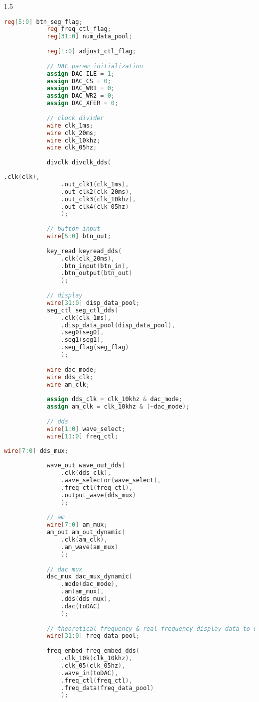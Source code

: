 {\begin{spacing}{1.5}
\begin{lstlisting}[language=Verilog]
			reg[5:0] btn_seg_flag;
			reg freq_ctl_flag;
			reg[31:0] num_data_pool;
		
			reg[1:0] adjust_ctl_flag;
		
			// DAC param initialization
			assign DAC_ILE = 1;
			assign DAC_CS = 0;
			assign DAC_WR1 = 0;
			assign DAC_WR2 = 0;
			assign DAC_XFER = 0;
		
			// clock divider
			wire clk_1ms;
			wire clk_20ms;
			wire clk_10khz;
			wire clk_05hz;
		
			divclk divclk_dds(
			\end{lstlisting}
			\begin{lstlisting}[language=Verilog]
				.clk(clk),
				.out_clk1(clk_1ms),
				.out_clk2(clk_20ms),
				.out_clk3(clk_10khz),
				.out_clk4(clk_05hz)
				);
			
			// button input
			wire[5:0] btn_out;
		
			key_read keyread_dds(
				.clk(clk_20ms),
				.btn_input(btn_in),
				.btn_output(btn_out)
				);
		
			// display
			wire[31:0] disp_data_pool;
			seg_ctl seg_ctl_dds(
				.clk(clk_1ms),
				.disp_data_pool(disp_data_pool),
				.seg0(seg0),
				.seg1(seg1),
				.seg_flag(seg_flag)
				);
		
			wire dac_mode;
			wire dds_clk;
			wire am_clk;
		
			assign dds_clk = clk_10khz & dac_mode;
			assign am_clk = clk_10khz & (~dac_mode);
		
			// dds
			wire[1:0] wave_select;
			wire[11:0] freq_ctl;
		\end{lstlisting}
		\begin{lstlisting}[language=Verilog]
			wire[7:0] dds_mux;
		
			wave_out wave_out_dds(
				.clk(dds_clk),
				.wave_selector(wave_select),
				.freq_ctl(freq_ctl),
				.output_wave(dds_mux)
				);
		
			// am
			wire[7:0] am_mux;
			am_out am_out_dynamic(
				.clk(am_clk),
				.am_wave(am_mux)
				);
		
			// dac mux
			dac_mux dac_mux_dynamic(
				.mode(dac_mode),
				.am(am_mux),
				.dds(dds_mux),
				.dac(toDAC)
				);
		
			// theoretical frequency & real frequency display data to display
			wire[31:0] freq_data_pool;
		
			freq_embed freq_embed_dds(
				.clk_10k(clk_10khz),
				.clk_05(clk_05hz),
				.wave_in(toDAC),
				.freq_ctl(freq_ctl),
				.freq_data(freq_data_pool)
				);
		

\end{lstlisting}
\end{spacing}}
